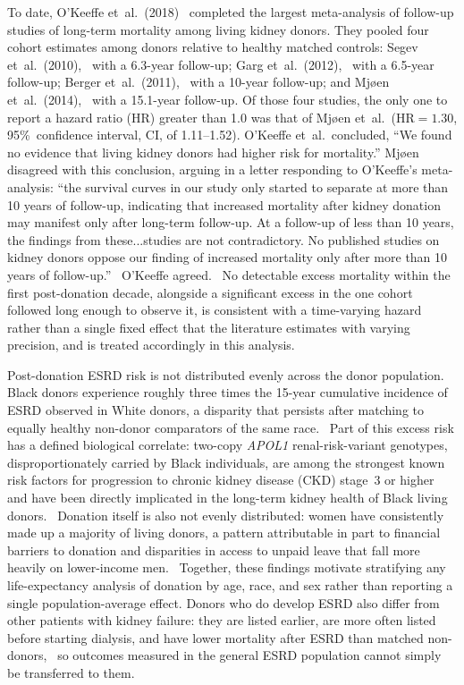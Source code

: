 To date, O'Keeffe et~al.\ (2018)~\cite{okeeffe_mid-_2018} completed the largest meta-analysis of follow-up studies of long-term mortality among living kidney donors. They pooled four cohort estimates among donors relative to healthy matched controls: Segev et~al.\ (2010),~\cite{segev_perioperative_2010} with a 6.3-year follow-up; Garg et~al.\ (2012),~\cite{garg2012} with a 6.5-year follow-up; Berger et~al.\ (2011),~\cite{berger2011} with a 10-year follow-up; and Mjøen et~al.\ (2014),~\cite{mjoeen_long-term_2014} with a 15.1-year follow-up. Of those four studies, the only one to report a hazard ratio (HR) greater than 1.0 was that of Mjøen et~al.\ (HR$=1.30$, 95\%~confidence interval, CI, of 1.11--1.52). O'Keeffe et~al.\ concluded, ``We found no evidence that living kidney donors had higher risk for mortality.'' Mjøen disagreed with this conclusion, arguing in a letter responding to O'Keeffe's meta-analysis: ``the survival curves in our study only started to separate at more than 10 years of follow-up, indicating that increased mortality after kidney donation may manifest only after long-term follow-up. At a follow-up of less than 10 years, the findings from these...studies are not contradictory. No published studies on kidney donors oppose our finding of increased mortality only after more than 10 years of follow-up.''~\cite{mjoeen_reply} O'Keeffe agreed.~\cite{okeeffe_reply_2018} No detectable excess mortality within the first post-donation decade, alongside a significant excess in the one cohort followed long enough to observe it, is consistent with a time-varying hazard rather than a single fixed effect that the literature estimates with varying precision, and is treated accordingly in this analysis.

Post-donation ESRD risk is not distributed evenly across the donor population. Black donors experience roughly three times the 15-year cumulative incidence of ESRD observed in White donors, a disparity that persists after matching to equally healthy non-donor comparators of the same race.~\cite{muzaale_risk_2014} Part of this excess risk has a defined biological correlate: two-copy \textit{APOL1} renal-risk-variant genotypes, disproportionately carried by Black individuals, are among the strongest known risk factors for progression to chronic kidney disease (CKD) stage~3 or higher and have been directly implicated in the long-term kidney health of Black living donors.~\cite{blackfolks} Donation itself is also not evenly distributed: women have consistently made up a majority of living donors, a pattern attributable in part to financial barriers to donation and disparities in access to unpaid leave that fall more heavily on lower-income men.~\cite{matas_gender_2018} Together, these findings motivate stratifying any life-expectancy analysis of donation by age, race, and sex rather than reporting a single population-average effect. Donors who do develop ESRD also differ from other patients with kidney failure: they are listed earlier, are more often listed before starting dialysis, and have lower mortality after ESRD than matched non-donors,~\cite{muzaale2016outcomes} so outcomes measured in the general ESRD population cannot simply be transferred to them.

